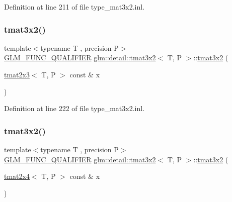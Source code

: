 Definition at line 211 of file type\+\_\+mat3x2.\+inl.

\mbox{\label{structglm_1_1detail_1_1tmat3x2_a2accfb7c3f02afa377299db31c7ed798}} 
\subsubsection{\texorpdfstring{tmat3x2()}{tmat3x2()}\hspace{0.1cm}{\footnotesize\ttfamily [14/22]}}
{\footnotesize\ttfamily template$<$typename T , precision P$>$ \\
\hyperlink{setup_8hpp_a33fdea6f91c5f834105f7415e2a64407}{G\+L\+M\+\_\+\+F\+U\+N\+C\+\_\+\+Q\+U\+A\+L\+I\+F\+I\+ER} \hyperlink{structglm_1_1detail_1_1tmat3x2}{glm\+::detail\+::tmat3x2}$<$ T, P $>$\+::\hyperlink{structglm_1_1detail_1_1tmat3x2}{tmat3x2} (\begin{DoxyParamCaption}\item[{\hyperlink{structglm_1_1detail_1_1tmat2x3}{tmat2x3}$<$ T, P $>$ const \&}]{x }\end{DoxyParamCaption})\hspace{0.3cm}{\ttfamily [explicit]}}



Definition at line 222 of file type\+\_\+mat3x2.\+inl.

\mbox{\label{structglm_1_1detail_1_1tmat3x2_a00df9d2a64b9663eb5f15a39a4c7f9ec}} 
\subsubsection{\texorpdfstring{tmat3x2()}{tmat3x2()}\hspace{0.1cm}{\footnotesize\ttfamily [15/22]}}
{\footnotesize\ttfamily template$<$typename T , precision P$>$ \\
\hyperlink{setup_8hpp_a33fdea6f91c5f834105f7415e2a64407}{G\+L\+M\+\_\+\+F\+U\+N\+C\+\_\+\+Q\+U\+A\+L\+I\+F\+I\+ER} \hyperlink{structglm_1_1detail_1_1tmat3x2}{glm\+::detail\+::tmat3x2}$<$ T, P $>$\+::\hyperlink{structglm_1_1detail_1_1tmat3x2}{tmat3x2} (\begin{DoxyParamCaption}\item[{\hyperlink{structglm_1_1detail_1_1tmat2x4}{tmat2x4}$<$ T, P $>$ const \&}]{x }\end{DoxyParamCaption})\hspace{0.3cm}{\ttfamily [explicit]}}



